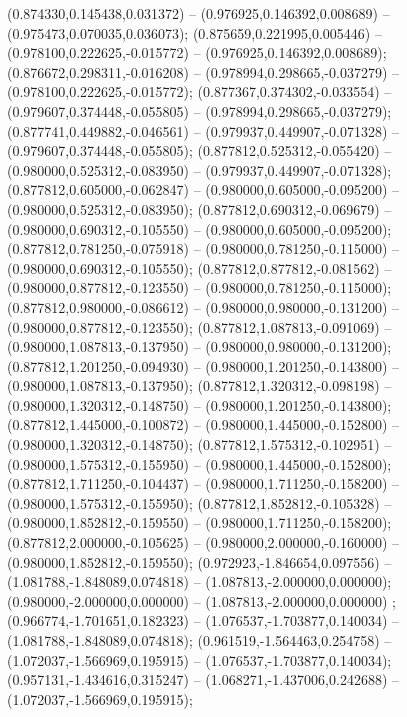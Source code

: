  (0.874330,0.145438,0.031372) -- (0.976925,0.146392,0.008689) -- (0.975473,0.070035,0.036073);
 (0.875659,0.221995,0.005446) -- (0.978100,0.222625,-0.015772) -- (0.976925,0.146392,0.008689);
 (0.876672,0.298311,-0.016208) -- (0.978994,0.298665,-0.037279) -- (0.978100,0.222625,-0.015772);
 (0.877367,0.374302,-0.033554) -- (0.979607,0.374448,-0.055805) -- (0.978994,0.298665,-0.037279);
 (0.877741,0.449882,-0.046561) -- (0.979937,0.449907,-0.071328) -- (0.979607,0.374448,-0.055805);
 (0.877812,0.525312,-0.055420) -- (0.980000,0.525312,-0.083950) -- (0.979937,0.449907,-0.071328);
 (0.877812,0.605000,-0.062847) -- (0.980000,0.605000,-0.095200) -- (0.980000,0.525312,-0.083950);
 (0.877812,0.690312,-0.069679) -- (0.980000,0.690312,-0.105550) -- (0.980000,0.605000,-0.095200);
 (0.877812,0.781250,-0.075918) -- (0.980000,0.781250,-0.115000) -- (0.980000,0.690312,-0.105550);
 (0.877812,0.877812,-0.081562) -- (0.980000,0.877812,-0.123550) -- (0.980000,0.781250,-0.115000);
 (0.877812,0.980000,-0.086612) -- (0.980000,0.980000,-0.131200) -- (0.980000,0.877812,-0.123550);
 (0.877812,1.087813,-0.091069) -- (0.980000,1.087813,-0.137950) -- (0.980000,0.980000,-0.131200);
 (0.877812,1.201250,-0.094930) -- (0.980000,1.201250,-0.143800) -- (0.980000,1.087813,-0.137950);
 (0.877812,1.320312,-0.098198) -- (0.980000,1.320312,-0.148750) -- (0.980000,1.201250,-0.143800);
 (0.877812,1.445000,-0.100872) -- (0.980000,1.445000,-0.152800) -- (0.980000,1.320312,-0.148750);
 (0.877812,1.575312,-0.102951) -- (0.980000,1.575312,-0.155950) -- (0.980000,1.445000,-0.152800);
 (0.877812,1.711250,-0.104437) -- (0.980000,1.711250,-0.158200) -- (0.980000,1.575312,-0.155950);
 (0.877812,1.852812,-0.105328) -- (0.980000,1.852812,-0.159550) -- (0.980000,1.711250,-0.158200);
 (0.877812,2.000000,-0.105625) -- (0.980000,2.000000,-0.160000) -- (0.980000,1.852812,-0.159550);
 (0.972923,-1.846654,0.097556) -- (1.081788,-1.848089,0.074818) -- (1.087813,-2.000000,0.000000);
 (0.980000,-2.000000,0.000000) -- (1.087813,-2.000000,0.000000) ;
 (0.966774,-1.701651,0.182323) -- (1.076537,-1.703877,0.140034) -- (1.081788,-1.848089,0.074818);
 (0.961519,-1.564463,0.254758) -- (1.072037,-1.566969,0.195915) -- (1.076537,-1.703877,0.140034);
 (0.957131,-1.434616,0.315247) -- (1.068271,-1.437006,0.242688) -- (1.072037,-1.566969,0.195915);
